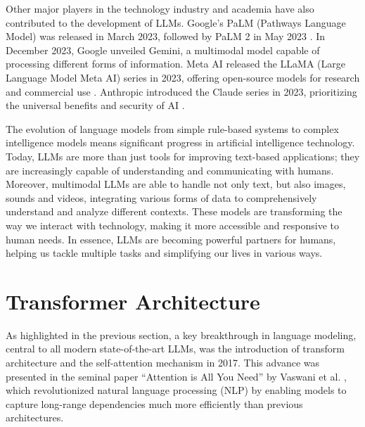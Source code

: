 Other major players in the technology industry and academia have also contributed to the development of LLMs. Google's PaLM (Pathways Language Model) was released in March 2023, followed by PaLM 2 in May 2023 \cite{chowdhery2023palm}. In December 2023, Google unveiled Gemini, a multimodal model capable of processing different forms of information. Meta AI released the LLaMA (Large Language Model Meta AI) series in 2023, offering open-source models for research and commercial use \cite{touvron2023llama}. Anthropic introduced the Claude series in 2023, prioritizing the universal benefits and security of AI \cite{anthropic2024claude}. \newline

The evolution of language models from simple rule-based systems to complex intelligence models means significant progress in artificial intelligence technology. Today, LLMs are more than just tools for improving text-based applications; they are increasingly capable of understanding and communicating with humans. Moreover, multimodal LLMs are able to handle not only text, but also images, sounds and videos, integrating various forms of data to comprehensively understand and analyze different contexts. These models are transforming the way we interact with technology, making it more accessible and responsive to human needs. In essence, LLMs are becoming powerful partners for humans, helping us tackle multiple tasks and simplifying our lives in various ways. \cite{researchgraph2024}

\section{Transformer Architecture}

As highlighted in the previous section, a key breakthrough in language modeling, central to all modern state-of-the-art LLMs, was the introduction of transform architecture and the self-attention mechanism in 2017. This advance was presented in the seminal paper “Attention is All You Need” by Vaswani et al. \cite{vaswani2017attention}, which revolutionized natural language processing (NLP) by enabling models to capture long-range dependencies much more efficiently than previous architectures.

